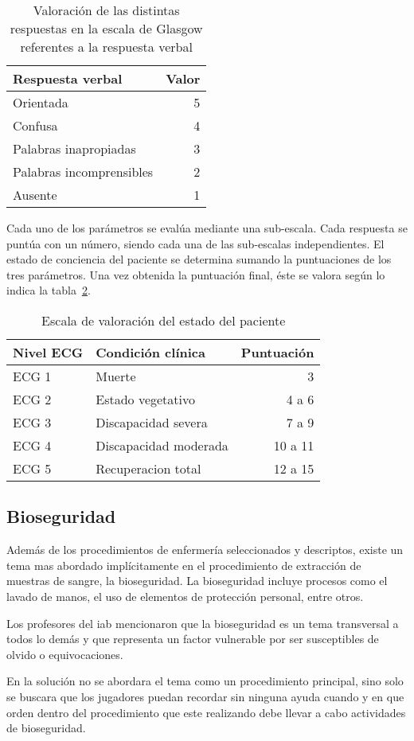 \begin{table}[!hbt]
\centering
\begin{tabular}{lr}
\toprule
\textbf{Respuesta verbal} & \textbf{Valor} \\
\midrule
Orientada & 5 \\
Confusa & 4 \\
Palabras inapropiadas & 3 \\
Palabras incomprensibles & 2 \\
Ausente & 1 \\
\bottomrule
\end{tabular}
\caption{Valoración de las distintas respuestas en la escala de Glasgow
    referentes a la respuesta verbal}
\label{tab:seleccion_glasgow_respuestas_verbal}
\end{table}

Cada uno de los parámetros se evalúa mediante una sub-escala. Cada respuesta se
puntúa con un número, siendo cada una de las sub-escalas independientes. El
estado de conciencia del paciente se determina sumando la puntuaciones de los
tres parámetros. Una vez obtenida la puntuación final, éste se valora según lo
indica la tabla~\ref{tab:seleccion_glasgow_estado}.

\begin{table}[!hbt]
\centering
\begin{tabular}{llr}
\toprule
\textbf{Nivel ECG} & 
\textbf{Condición clínica} & 
\textbf{Puntuación} \\ 
\midrule
 ECG 1 & Muerte & 3 \\
 ECG 2 & Estado vegetativo & 4 a 6 \\
 ECG 3 & Discapacidad severa & 7 a 9 \\
 ECG 4 & Discapacidad moderada & 10 a 11 \\
 ECG 5 & Recuperacion total & 12 a 15 \\
\bottomrule
\end{tabular}
\caption{Escala de valoración del estado del paciente}
\label{tab:seleccion_glasgow_estado}
\end{table}

\subsection{Bioseguridad}

Además de los procedimientos de enfermería seleccionados y descriptos, existe un
tema mas abordado implícitamente en el procedimiento de extracción de muestras
de sangre, la bioseguridad. La bioseguridad incluye procesos como el lavado de
manos, el uso de elementos de protección personal, entre otros.

Los profesores del \Gls{iab} mencionaron que la bioseguridad es un tema
transversal a todos lo demás y que representa un factor vulnerable por ser
susceptibles de olvido o equivocaciones.

En la solución no se abordara el tema como un procedimiento principal, sino solo
se buscara que los jugadores puedan recordar sin ninguna ayuda cuando y en que
orden dentro del procedimiento que este realizando debe llevar a cabo
actividades de bioseguridad.
